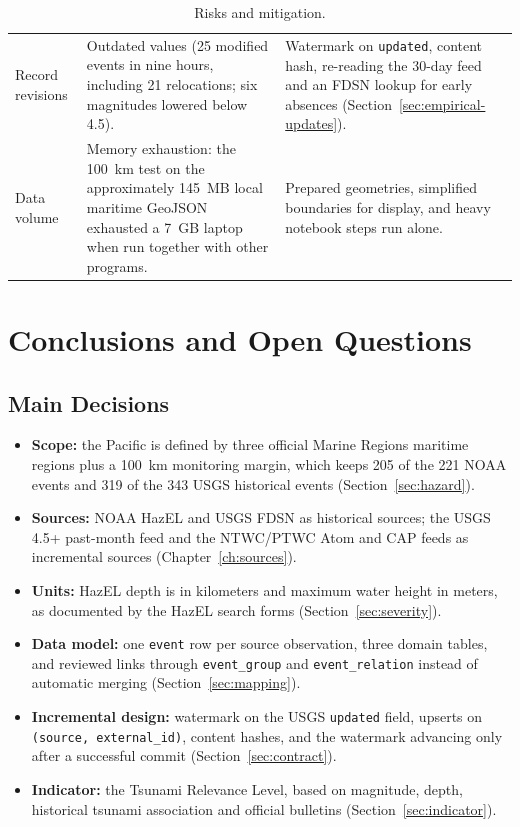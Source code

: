 \documentclass[a4paper,11pt,oneside]{book}
\begin{document}
\begin{table}[H]
\begin{tabularx}{\textwidth}{@{}>{\raggedright\arraybackslash}p{2.6cm}>{\raggedright\arraybackslash}X>{\raggedright\arraybackslash}X@{}}
Record revisions & Outdated values (25 modified events in nine hours, including 21 relocations; six magnitudes lowered below 4.5). & Watermark on \texttt{updated}, content hash, re-reading the 30-day feed and an FDSN lookup for early absences (Section~\ref{sec:empirical-updates}). \\
Data volume & Memory exhaustion: the 100~km test on the approximately 145~MB local maritime GeoJSON exhausted a 7~GB laptop when run together with other programs. & Prepared geometries, simplified boundaries for display, and heavy notebook steps run alone. \\
\bottomrule
\end{tabularx}
\caption{Risks and mitigation.}
\label{tab:risks}
\end{table}

\chapter{Conclusions and Open Questions}
\label{ch:conclusions}
\section{Main Decisions}
\begin{itemize}[nosep]
  \item \textbf{Scope:} the Pacific is defined by three official Marine Regions maritime regions plus a 100~km monitoring margin, which keeps 205 of the 221 NOAA events and 319 of the 343 USGS historical events (Section~\ref{sec:hazard}).
  \item \textbf{Sources:} NOAA HazEL and USGS FDSN as historical sources; the USGS 4.5+ past-month feed and the NTWC/PTWC Atom and CAP feeds as incremental sources (Chapter~\ref{ch:sources}).
  \item \textbf{Units:} HazEL depth is in kilometers and maximum water height in meters, as documented by the HazEL search forms (Section~\ref{sec:severity}).
  \item \textbf{Data model:} one \texttt{event} row per source observation, three domain tables, and reviewed links through \texttt{event\_group} and \texttt{event\_relation} instead of automatic merging (Section~\ref{sec:mapping}).
  \item \textbf{Incremental design:} watermark on the USGS \texttt{updated} field, upserts on \texttt{(source, external\_id)}, content hashes, and the watermark advancing only after a successful commit (Section~\ref{sec:contract}).
  \item \textbf{Indicator:} the Tsunami Relevance Level, based on magnitude, depth, historical tsunami association and official bulletins (Section~\ref{sec:indicator}).
\end{itemize}
\end{document}
